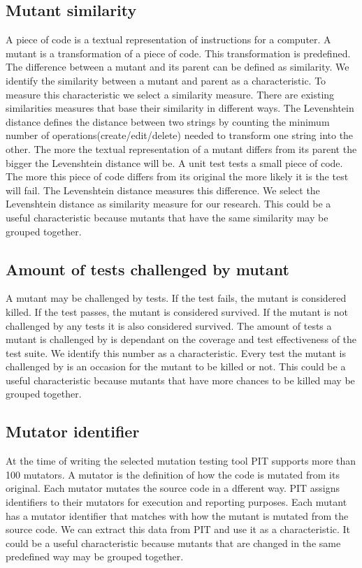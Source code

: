 \documentclass[../../main]{subfiles}
\begin{document}
\subsection{Mutant similarity}
A piece of code is a textual representation of instructions for a computer.
A mutant is a transformation of a piece of code.
This transformation is predefined.
The difference between a mutant and its parent can be defined as similarity.
We identify the similarity between a mutant and parent as a characteristic.
\newline
To measure this characteristic we select a similarity measure.
There are existing similarities measures that base their similarity in different ways\cite{Gomma2013AApproaches}. 
\newline
The Levenshtein distance defines the distance between two strings by counting the minimum number of operations(create/edit/delete) needed to transform one string into the other\cite{Gomma2013AApproaches}.
The more the textual representation of a mutant differs from its parent the bigger the Levenshtein distance will be.
A unit test tests a small piece of code.
The more this piece of code differs from its original the more likely it is the test will fail.
The Levenshtein distance measures this difference.
We select the Levenshtein distance as similarity measure for our research\cite{Gomma2013AApproaches}.
This could be a useful characteristic because mutants that have the same similarity may be grouped together.

\subsection{Amount of tests challenged by mutant}
A mutant may be challenged by tests.
If the test fails, the mutant is considered killed.
If the test passes, the mutant is considered survived.
If the mutant is not challenged by any tests it is also considered survived.
The amount of tests a mutant is challenged by is dependant on the coverage and test effectiveness of the test suite.
We identify this number as a characteristic.
Every test the mutant is challenged by is an occasion for the mutant to be killed or not.
This could be a useful characteristic because mutants that have more chances to be killed may be grouped together.

\subsection{Mutator identifier}
At the time of writing the selected mutation testing tool PIT supports more than 100 mutators\cite{pitestMutators}.
A mutator is the definition of how the code is mutated from its original\cite{Offutt2001}.
Each mutator mutates the source code in a dfferent way.
PIT assigns identifiers to their mutators for execution and reporting purposes. 
Each mutant has a mutator identifier that matches with how the mutant is mutated from the source code.
We can extract this data from PIT and use it as a characteristic.
It could be a useful characteristic because mutants that are changed in the same predefined way may be grouped together.
\end{document}
